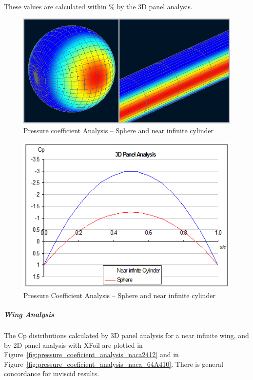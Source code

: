 \documentclass[a4paper,twoside,12pt,dvips]{article}
\begin{document}
These values are calculated within \% by the 3D panel analysis.

\begin{figure}[htbp]
  \includegraphics[width=0.8\linewidth]{img-21}\centering 
  \caption{Pressure coefficient Analysis -- Sphere and near infinite cylinder}
  \label{fig:pressure_coeficient_analysis}
\end{figure}

\begin{figure}[htbp]
  \includegraphics[width=0.8\linewidth]{img-22}\centering 
  \caption{Pressure Coefficient Analysis -- Sphere and near infinite cylinder}
  \label{fig:pressure_coeficient_analysis_2}
\end{figure}

\subparagraph{Wing Analysis}

The Cp distributions calculated by 3D panel analysis for a near
infinite wing, and by 2D panel analysis with XFoil are plotted in
Figure~\ref{fig:pressure_coeficient_analysis_naca2412} and in
Figure~\ref{fig:pressure_coeficient_analysis_naca_64A410}. There is
general concordance for inviscid results.
\end{document}
